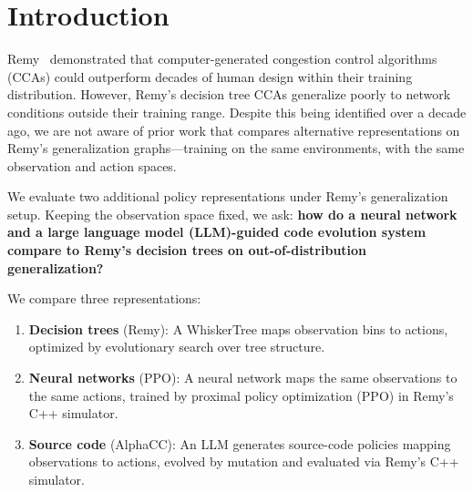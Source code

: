 \section{Introduction}

Remy~\cite{winstein2013tcp} demonstrated that computer-generated congestion
control algorithms (CCAs) could outperform decades of human design within their
training distribution. However, Remy's decision tree CCAs generalize poorly
to network conditions outside their training range. Despite this being
identified over a decade ago, we are not aware of prior work that compares
alternative representations on Remy's generalization graphs---training
on the same environments, with the same observation and action spaces.

We evaluate two additional policy representations under Remy's
generalization setup. Keeping the observation space fixed, we ask:
\textbf{how do a neural network and a large language model (LLM)-guided
code evolution system compare to Remy's decision trees on
out-of-distribution generalization?}

We compare three representations:

\begin{enumerate}
\item \textbf{Decision trees} (Remy): A WhiskerTree maps observation bins to
  actions, optimized by evolutionary search over tree structure.
\item \textbf{Neural networks} (PPO): A neural network maps the same observations
  to the same actions, trained by
  proximal policy optimization (PPO) \cite{schulman2017ppo} in Remy's C++ simulator.
\item \textbf{Source code} (AlphaCC): An LLM generates
  source-code policies mapping observations to actions, evolved by
  mutation and evaluated via Remy's C++ simulator.
\end{enumerate}

